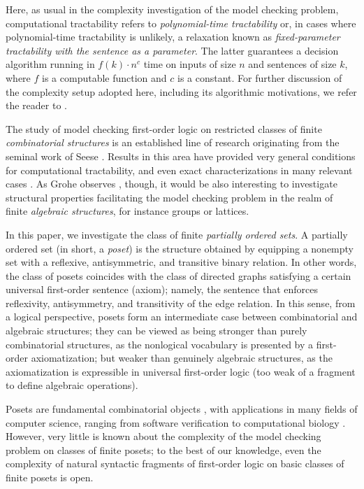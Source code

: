 \documentclass[usletter]{article}
\begin{document}
Here, as usual in the complexity investigation of the model checking problem, 
computational tractability refers to \emph{polynomial-time tractability} or, 
in cases where polynomial-time tractability is unlikely, 
a relaxation known as \emph{fixed-parameter tractability with the sentence as a parameter}. 
The latter guarantees a decision algorithm running 
in $f(k) \cdot n^c$ time on inputs of size $n$ 
and sentences of size $k$, 
where $f$ is a computable function and $c$ is a constant. For further discussion of the complexity setup adopted here, 
including its algorithmic motivations, 
we refer the reader to \cite{Grohe07a, FlumGrohe06}.

The study of model checking first-order logic on restricted 
classes of finite \emph{combinatorial structures} is an established line of research originating from the seminal work of Seese \cite{Seese96}. Results in this area have provided very general conditions for computational tractability, and 
even exact characterizations in many relevant cases \cite{GroheKreutzerSiebertz14}.  
As Grohe observes \cite{Grohe07a}, though, 
it would be also interesting to investigate structural properties 
facilitating the model checking problem in the realm of finite \emph{algebraic structures}, 
for instance groups or lattices.  

In this paper, we investigate the class of finite \emph{partially ordered sets}.  
A partially ordered set (in short, a \emph{poset}) is the structure obtained by equipping a nonempty 
set with a reflexive, antisymmetric, and transitive binary relation.  In other words, 
the class of posets coincides with the class of directed graphs satisfying 
a certain universal first-order sentence (axiom); namely, the sentence that enforces 
reflexivity, antisymmetry, and transitivity of the edge relation.  
In this sense, from a logical perspective, posets form 
an intermediate case between combinatorial and algebraic structures; 
they can be viewed as being stronger than purely combinatorial structures, 
as the nonlogical vocabulary is presented by a first-order axiomatization; 
but weaker than genuinely algebraic structures, as the axiomatization 
is expressible in universal first-order logic (too weak of a fragment to define algebraic operations).  

Posets are fundamental combinatorial objects \cite[Chapter~8]{GrahamGrotschelLovasz95}, 
with applications in many fields of computer science, ranging from software verification \cite{NielsonNielsonHankin05} 
to computational biology \cite{RauschReinert10}.  However, 
very little is known about the complexity of the model checking problem on classes of finite posets; 
to the best of our knowledge, even the complexity of natural syntactic fragments of first-order logic 
on basic classes of finite posets is open.  
\end{document}
